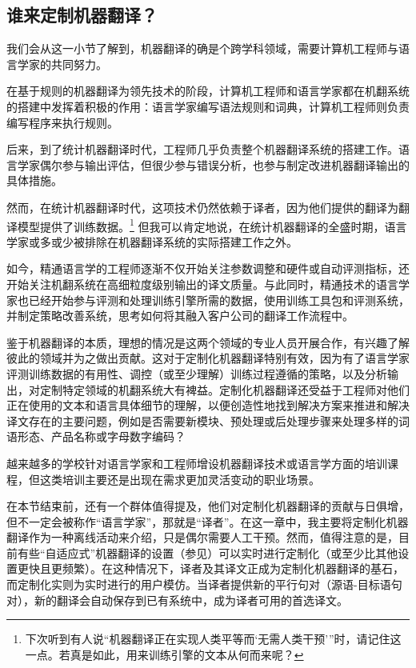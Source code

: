 \documentclass[output=paper]{langscibook}
\begin{document}
\subsection{谁来定制机器翻译？}
我们会从这一小节了解到，机器翻译的确是个跨学科领域，需要计算机工程师与语言学家的共同努力。

在基于规则的机器翻译为领先技术的阶段，计算机工程师和语言学家都在机翻系统的搭建中发挥着积极的作用：语言学家编写语法规则和词典，计算机工程师则负责编写程序来执行规则\textbf{}。

\begin{sloppypar}
后来，到了统计机器翻译时代，工程师几乎负责整个机器翻译系统的搭建工作。语言学家偶尔参与输出评估，但很少参与错误分析，也参与制定改进机器翻译输出的具体措施。
\end{sloppypar}

然而，在统计机器翻译时代，这项技术仍然依赖于译者，因为他们提供的翻译为翻译模型提供了训练数据。\footnote{下次听到有人说“机器翻译正在实现人类平等而‘无需人类干预’”时，请记住这一点。若真是如此，用来训练引擎的文本从何而来呢？} 但我可以肯定地说，在统计机器翻译的全盛时期，语言学家或多或少被排除在机器翻译系统的实际搭建工作之外。

如今，精通语言学的工程师逐渐不仅开始关注参数调整和硬件或自动评测指标，还开始关注机翻系统在高细粒度级别输出的译文质量。与此同时，精通技术的语言学家也已经开始参与评测和处理训练引擎所需的数据，使用训练工具包和评测系统，并制定策略改善系统，思考如何将其融入客户公司的翻译工作流程中。

鉴于机器翻译的本质，理想的情况是这两个领域的专业人员开展合作，有兴趣了解彼此的领域并为之做出贡献。这对于定制化机器翻译特别有效，因为有了语言学家评测训练数据的有用性、调控（或至少理解）训练过程遵循的策略，以及分析输出，对定制特定领域的机翻系统大有裨益。定制化机器翻译还受益于工程师对他们正在使用的文本和语言具体细节的理解，以便创造性地找到解决方案来推进和解决译文存在的主要问题，例如是否需要新模块、预处理或后处理步骤来处理多样的词语形态、产品名称或字母数字编码？

越来越多的学校针对语言学家和工程师增设机器翻译技术或语言学方面的培训课程，但这类培训主要还是出现在需求更加灵活变动的职业场景。

在本节结束前，还有一个群体值得提及，他们对定制化机器翻译的贡献与日俱增，但不一定会被称作“语言学家”，那就是“译者”。在这一章中，我主要将定制化机器翻译作为一种离线活动来介绍，只是偶尔需要人工干预。然而，值得注意的是，目前有些“自适应式”机器翻译的设置（参见）可以实时进行定制化（或至少比其他设置更快且更频繁）。在这种情况下，译者及其译文正成为定制化机器翻译的基石，而定制化实则为实时进行的用户模仿。当译者提供新的平行句对（源语-目标语句对），新的翻译会自动保存到已有系统中，成为译者可用的首选译文。
\end{document}
